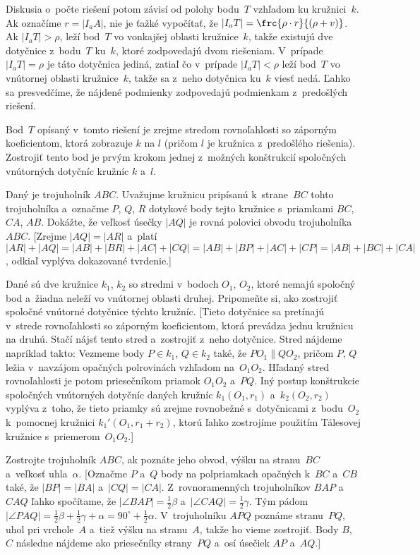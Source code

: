 {Diskusia o~počte riešení potom závisí od polohy bodu~$T$ vzhľadom
ku kružnici~$k$. Ak označíme $r =|I_aA|$,
nie je ťažké vypočítať, že $|I_aT|= \frc{\rho \cdot r}{(\rho+v)}$.
Ak ${|I_aT|> \rho}$, leží bod~$T$ vo vonkajšej oblasti kružnice~$k$, takže
existujú dve dotyčnice z~bodu~$T$ ku~$k$, ktoré zodpovedajú dvom
riešeniam. V~prípade $|I_aT|= \rho$ je táto dotyčnica jediná,
zatiaľ čo v~prípade $|I_aT|<\rho$ leží bod~$T$ vo vnútornej oblasti
kružnice~$k$, takže sa z~neho dotyčnica ku~$k$ viesť nedá. Ľahko sa
presvedčíme, že nájdené podmienky zodpovedajú podmienkam
z~predošlých riešení.

\poznamka
Bod~$T$ opísaný v~tomto
riešení je zrejme stredom rovnoľahlosti so záporným koeficientom, ktorá
zobrazuje $k$ na $l$ (pričom $l$ je kružnica z~predošlého riešenia). Zostrojiť
tento bod je prvým krokom jednej z~možných konštrukcií spoločných
vnútorných dotyčníc kružníc $k$ a~$l$.


Daný je trojuholník $ABC$. Uvažujme kružnicu
pripísanú k~strane~$BC$ tohto trojuholníka a~označme $P$, $Q$, $R$
dotykové body tejto kružnice s~priamkami $BC$, $CA$, $AB$. Dokážte,
že veľkosť úsečky $|AQ|$ je rovná polovici obvodu trojuholníka~$ABC$.
[Zrejme $|AQ|=|AR|$ a~platí
$|AR|+|AQ|=|AB|+|BR|+|AC|+|CQ|=|AB|+|BP|+|AC|+|CP|=|AB|+|BC|+|CA|$,
odkiaľ vyplýva dokazované tvrdenie.]

Dané sú dve kružnice $k_1$, $ k_2$ so stredmi v~bodoch
$O_1$, $ O_2$, ktoré nemajú spoločný bod a~žiadna neleží vo vnútornej oblasti druhej.
Pripomeňte si, ako zostrojiť spoločné vnútorné dotyčnice týchto
kružníc. [Tieto dotyčnice sa pretínajú v~strede rovnoľahlosti so
záporným koeficientom, ktorá prevádza jednu kružnicu na druhú.
Stačí nájsť tento stred a~zostrojiť z~neho dotyčnice. Stred
nájdeme napríklad takto: Vezmeme body $P \in k_1$, $Q \in k_2$
také, že $PO_1 \parallel QO_2$, pričom $P$, $ Q$ ležia v~navzájom
opačných polrovinách vzhľadom na~$O_1O_2$. Hľadaný stred
rovnoľahlosti je potom priesečníkom priamok $O_1O_2$ a~$PQ$.
Iný postup konštrukcie spoločných vnútorných dotyčníc daných kružníc
$k_1(O_1,r_1)$ a~$k_2(O_2,r_2)$ vyplýva z~toho, že tieto priamky
sú zrejme rovnobežné s~dotyčnicami z~bodu~$O_2$ k~pomocnej kružnici
$k_1'(O_1,r_1+r_2)$, ktorú ľahko zostrojíme použitím Tálesovej kružnice
s~priemerom~$O_1O_2$.]

Zostrojte trojuholník $ABC$, ak poznáte jeho obvod,
výšku na stranu~$BC$ a~veľkosť uhla~$\alpha$. [Označme $P$ a~$Q$
body na polpriamkach opačných k~$BC$ a~$CB$ také, že $|BP|=|BA|$
a~$|CQ|=|CA|$. Z~rovnoramenných trojuholníkov $BAP$ a~$CAQ$ ľahko
spočítame, že $|\angle BAP|= \frac12 {\beta}$ a~$|\angle
CAQ|= \frac12 {\gamma}$. Tým pádom $|\angle PAQ|=
\frac12 {\beta}+\frac12 {\gamma}+\alpha = 90^\circ+\frac12 {\alpha}$.
V~trojuholníku $APQ$ poznáme stranu~$PQ$, uhol pri vrchole~$A$ a~tiež
výšku na stranu~$A$, takže ho vieme zostrojiť. Body $B$, $C$ následne
nájdeme ako priesečníky strany~$PQ$ a~osí úsečiek $AP$ a~$AQ$.]

}
